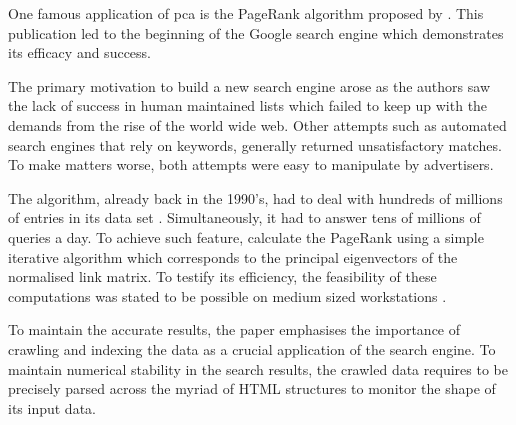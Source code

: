 One famous application of \acrlong{pca} \cite{deisenroth2020mathematics} is the PageRank algorithm proposed by .
This publication led to the beginning of the Google search engine which demonstrates its efficacy and success.

The primary motivation to build a new search engine arose as the authors saw the lack of success in human maintained lists which failed to keep up with the demands from the rise of the world wide web.
Other attempts such as automated search engines that rely on keywords, generally returned unsatisfactory matches.
To make matters worse, both attempts were easy to manipulate by advertisers.
\bigskip


The algorithm, already back in the 1990's, had to deal with hundreds of millions of entries in its data set \cite{brin1998anatomy}.
Simultaneously, it had to answer tens of millions of queries a day.
To achieve such feature, \citeauthor{page1999pagerank} calculate the PageRank using a simple iterative algorithm which corresponds to the principal eigenvectors of the normalised link matrix.
To testify its efficiency, the feasibility of these computations was stated to be possible on medium sized workstations \cite{page1999pagerank}.

To maintain the accurate results, the paper emphasises the importance of crawling and indexing the data as a crucial application of the search engine.
To maintain numerical stability in the search results, the crawled data requires to be precisely parsed across the myriad of HTML structures to monitor the shape of its input data.
